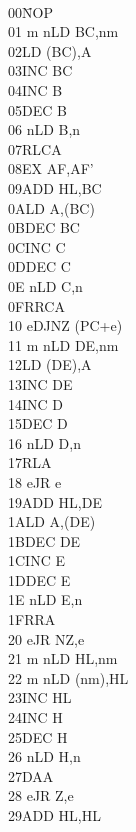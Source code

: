 \documentclass[12pt,twoside,openright,a4paper]{book}
\begin{document}
\setlength\columnsep{4em}
\begin{multicols}{3}
{
	\tt 
	\footnotesize
	\begin{tabbing}
	00{\qquad}{\qquad}{\quad}\=NOP\\
	01 m n\>LD BC,nm\\
	02\>LD (BC),A\\
	03\>INC BC\\
	04\>INC B\\
	05\>DEC B\\
	06 n\>LD B,n\\
	07\>RLCA\\
	08\>EX AF,AF'\\
	09\>ADD HL,BC\\
	0A\>LD A,(BC)\\
	0B\>DEC BC\\
	0C\>INC C\\
	0D\>DEC C\\
	0E n\>LD C,n\\
	0F\>RRCA\\
	10 e\>DJNZ (PC+e)\\
	11 m n\>LD DE,nm\\
	12\>LD (DE),A\\
	13\>INC DE\\
	14\>INC D\\
	15\>DEC D\\
	16 n\>LD D,n\\
	17\>RLA\\
	18 e\>JR e\\
	19\>ADD HL,DE\\
	1A\>LD A,(DE)\\
	1B\>DEC DE\\
	1C\>INC E\\
	1D\>DEC E\\
	1E n\>LD E,n\\
	1F\>RRA\\
	20 e\>JR NZ,e\\
	21 m n\>LD HL,nm\\
	22 m n\>LD (nm),HL\\
	23\>INC HL\\
	24\>INC H\\
	25\>DEC H\\
	26 n\>LD H,n\\
	27\>DAA\\
	28 e\>JR Z,e\\
	29\>ADD HL,HL\\

\end{tabbing}}
\end{multicols}
\end{document}
